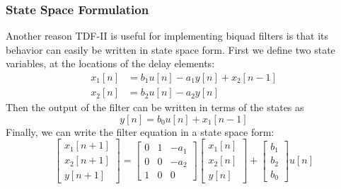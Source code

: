 \documentclass[twoside,a4paper]{article}
\begin{document}
\subsubsection{State Space Formulation}

Another reason TDF-II is useful for implementing biquad filters
is that its behavior can easily be written in state space form.
First we define two state variables, at the locations of the delay
elements:
%
\begin{equation}
    \begin{split}
        x_1[n] &= b_1 u[n] - a_1 y[n] + x_2[n-1] \\
        x_2[n] &= b_2 u[n] - a_2 y[n]
    \end{split}
    \label{eq:bq_lin_states}
\end{equation}
%
Then the output of the filter can be written in terms of the states
as
%
\begin{equation}
    y[n] = b_0 u[n] + x_1[n-1]
    \label{eq:state_output_lin}
\end{equation}
%
Finally, we can write the filter equation in a state space form:
%
\begin{equation}
    \begin{bmatrix} x_1[n+1] \\ x_2[n+1] \\ y[n+1] \end{bmatrix} =
    \begin{bmatrix} 0& 1& -a_1\\ 0& 0& -a_2\\ 1& 0& 0 \end{bmatrix}
    \begin{bmatrix} x_1[n] \\ x_2[n] \\ y[n] \end{bmatrix}
    + \begin{bmatrix} b_1\\ b_2\\ b_0 \end{bmatrix} u[n]
    \label{eq:bq_lin_state_spaces}
\end{equation}
\end{document}
